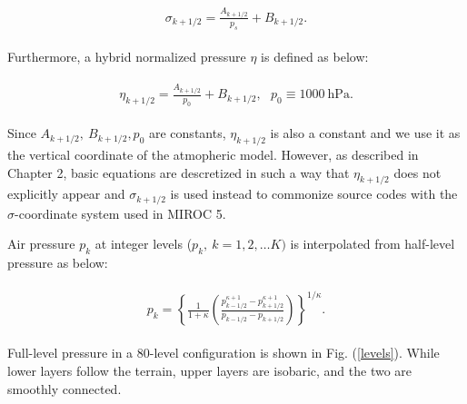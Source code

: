 \begin{eqnarray}
\begin{aligned}
\sigma_{k+1/2} = \frac{A_{k+1/2}}{p_s} +B_{k+1/2}.\end{aligned}
\end{eqnarray}

Furthermore, a hybrid normalized pressure \(\eta\) is defined as below:

\begin{eqnarray}
\begin{aligned}
\eta_{k+1/2} = \frac{A_{k+1/2}}{p_0} +B_{k+1/2},\ \ \ p_0\equiv 1000\ \mathrm{hPa}.
\end{aligned}
\end{eqnarray}

Since \(A_{k+1/2},\ B_{k+1/2}, p_0\) are constants, \(\eta_{k+1/2}\) is also a constant and we use it as the vertical coordinate of the atmopheric model. However, as described in Chapter 2, basic
equations are descretized in such a way that \(\eta_{k+1/2}\) does not explicitly appear and \(\sigma_{k+1/2}\) is used instead to commonize source codes with the \(\sigma\)-coordinate system used in
MIROC 5.

Air pressure \(p_k\) at integer levels (\(p_k,\ k=1,2,\ldots K)\) is interpolated from half-level pressure as below:

\begin{eqnarray}
\begin{aligned}
p_k = \left\{ \frac{1}{1+\kappa}
\left( \frac{  p^{\kappa +1}_{k-1/2}
- p^{\kappa +1}_{k+1/2}      }
{ p_{k-1/2} - p_{k+1/2} }
\right)
\right\}^{1/\kappa}.
\end{aligned}
\end{eqnarray}

Full-level pressure in a 80-level configuration is shown in Fig. (\ref{levels}). While lower layers follow the terrain, upper layers are isobaric, and the two are smoothly connected.

